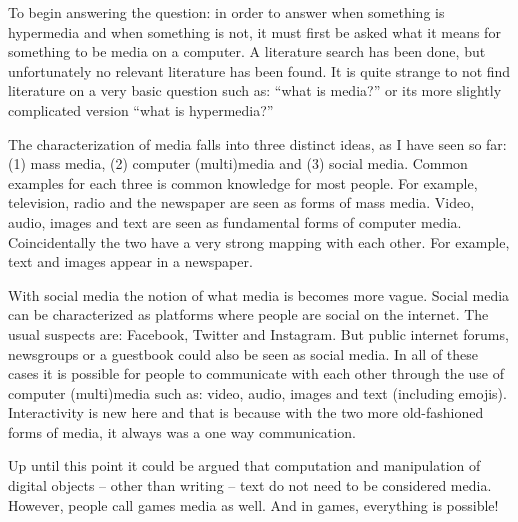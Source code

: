 To begin answering the question: in order to answer when something is hypermedia and when something is not, it must first be asked what it means for something to be media on a computer. A literature search has been done, but unfortunately no relevant literature has been found. It is quite strange to not find literature on a very basic question such as: ``what is media?'' or its more slightly complicated version ``what is hypermedia?''



The characterization of media falls into three distinct ideas, as I have seen so far: (1) mass media, (2) computer (multi)media and (3) social media. Common examples for each three is common knowledge for most people. For example, television, radio and the newspaper are seen as forms of mass media. Video, audio, images and text are seen as fundamental forms of computer media. Coincidentally the two have a very strong mapping with each other. For example, text and images appear in a newspaper. 

With social media the notion of what media is becomes more vague. Social media can be characterized as platforms where people are social on the internet. The usual suspects are: Facebook, Twitter and Instagram. But public internet forums, newsgroups or a guestbook could also be seen as social media. In all of these cases it is possible for people to communicate with each other through the use of computer (multi)media such as: video, audio, images and text (including emojis). 
Interactivity is new here and that is because with the two more old-fashioned forms of media, it always was a one way communication. 

Up until this point it could be argued that computation and manipulation of digital objects -- other than writing -- text do not need to be considered media. However, people call games media as well. And in games, everything is possible!

